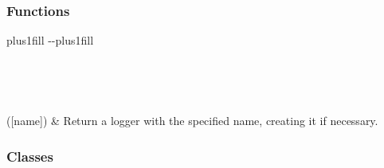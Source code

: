 \documentclass[letterpaper,10pt,english]{sphinxmanual}
\begin{document}
\subsubsection*{Functions}


\begin{savenotes}
\sphinxatlongtablestart
\sphinxthistablewithglobalstyle
\sphinxthistablewithnovlinesstyle
\makeatletter
  \LTleft \@totalleftmargin plus1fill
  \LTright\dimexpr\columnwidth-\@totalleftmargin-\linewidth\relax plus1fill
\makeatother
\begin{longtable}{}
\sphinxtoprule
\endfirsthead

\\
\sphinxtoprule
\endhead

\sphinxbottomrule
{}\\
\endfoot

\endlastfoot
\sphinxtableatstartofbodyhook

\sphinxAtStartPar
{}({[}name{]})
&
\sphinxAtStartPar
Return a logger with the specified name, creating it if necessary.
\\
\sphinxbottomrule
\end{longtable}
\sphinxtableafterendhook
\sphinxatlongtableend
\end{savenotes}
\subsubsection*{Classes}
\end{document}
